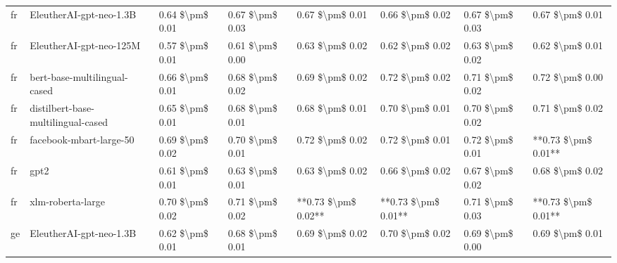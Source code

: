 \begin{tabular}{llllllll}
      fr &            EleutherAI-gpt-neo-1.3B & 0.64 \$\textbackslash pm\$ 0.01 &           0.67 \$\textbackslash pm\$ 0.03 &       0.67 \$\textbackslash pm\$ 0.01 &        0.66 \$\textbackslash pm\$ 0.02 &                         0.67 \$\textbackslash pm\$ 0.03 &     0.67 \$\textbackslash pm\$ 0.01 \\
      fr &            EleutherAI-gpt-neo-125M & 0.57 \$\textbackslash pm\$ 0.01 &           0.61 \$\textbackslash pm\$ 0.00 &       0.63 \$\textbackslash pm\$ 0.02 &        0.62 \$\textbackslash pm\$ 0.02 &                         0.63 \$\textbackslash pm\$ 0.02 &     0.62 \$\textbackslash pm\$ 0.01 \\
      fr &       bert-base-multilingual-cased & 0.66 \$\textbackslash pm\$ 0.01 &           0.68 \$\textbackslash pm\$ 0.02 &       0.69 \$\textbackslash pm\$ 0.02 &        0.72 \$\textbackslash pm\$ 0.02 &                         0.71 \$\textbackslash pm\$ 0.02 &     0.72 \$\textbackslash pm\$ 0.00 \\
      fr & distilbert-base-multilingual-cased & 0.65 \$\textbackslash pm\$ 0.01 &           0.68 \$\textbackslash pm\$ 0.01 &       0.68 \$\textbackslash pm\$ 0.01 &        0.70 \$\textbackslash pm\$ 0.01 &                         0.70 \$\textbackslash pm\$ 0.02 &     0.71 \$\textbackslash pm\$ 0.02 \\
      fr &            facebook-mbart-large-50 & 0.69 \$\textbackslash pm\$ 0.02 &           0.70 \$\textbackslash pm\$ 0.01 &       0.72 \$\textbackslash pm\$ 0.02 &        0.72 \$\textbackslash pm\$ 0.01 &                         0.72 \$\textbackslash pm\$ 0.01 & **0.73 \$\textbackslash pm\$ 0.01** \\
      fr &                               gpt2 & 0.61 \$\textbackslash pm\$ 0.01 &           0.63 \$\textbackslash pm\$ 0.01 &       0.63 \$\textbackslash pm\$ 0.02 &        0.66 \$\textbackslash pm\$ 0.02 &                         0.67 \$\textbackslash pm\$ 0.02 &     0.68 \$\textbackslash pm\$ 0.02 \\
      fr &                  xlm-roberta-large & 0.70 \$\textbackslash pm\$ 0.02 &           0.71 \$\textbackslash pm\$ 0.02 &   **0.73 \$\textbackslash pm\$ 0.02** &    **0.73 \$\textbackslash pm\$ 0.01** &                         0.71 \$\textbackslash pm\$ 0.03 & **0.73 \$\textbackslash pm\$ 0.01** \\
      ge &            EleutherAI-gpt-neo-1.3B & 0.62 \$\textbackslash pm\$ 0.01 &           0.68 \$\textbackslash pm\$ 0.01 &       0.69 \$\textbackslash pm\$ 0.02 &        0.70 \$\textbackslash pm\$ 0.02 &                         0.69 \$\textbackslash pm\$ 0.00 &     0.69 \$\textbackslash pm\$ 0.01 \\

\end{tabular}
